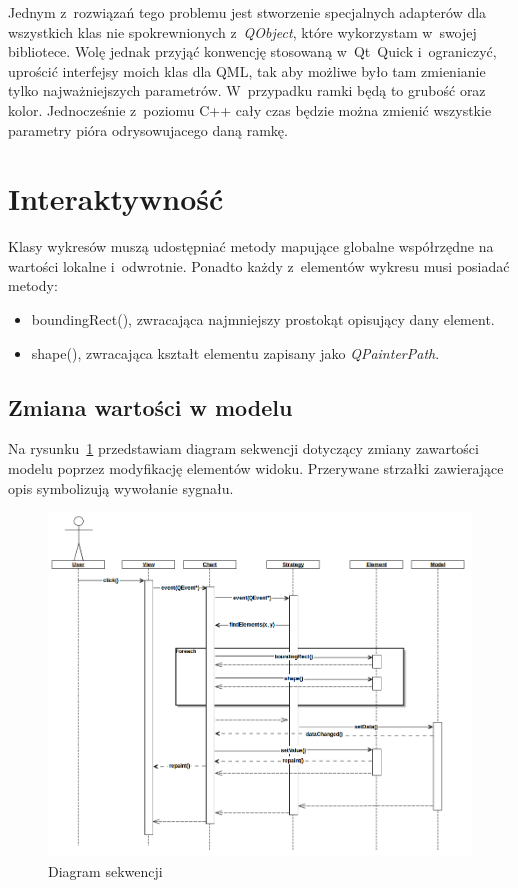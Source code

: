 Jednym z~rozwiązań tego problemu jest stworzenie specjalnych adapterów dla wszystkich klas nie spokrewnionych z~\textit{QObject}, które wykorzystam w~swojej bibliotece. Wolę jednak przyjąć konwencję stosowaną w~Qt~Quick i~ograniczyć, uprościć interfejsy moich klas dla QML, tak aby możliwe było tam zmienianie tylko najważniejszych parametrów. W~przypadku ramki będą to grubość oraz kolor. Jednocześnie z~poziomu C++ cały czas będzie można zmienić wszystkie parametry pióra odrysowujacego daną ramkę.

\section{Interaktywność}
Klasy wykresów muszą udostępniać metody mapujące globalne współrzędne na wartości lokalne i~odwrotnie. Ponadto każdy z~elementów wykresu musi posiadać metody:
\begin{itemize}
\item{boundingRect(), zwracająca najmniejszy prostokąt opisujący dany element.}
\item{shape(), zwracająca kształt elementu zapisany jako \textit{QPainterPath}.}
\end{itemize}

\subsection{Zmiana wartości w modelu}
Na rysunku~\ref{rys:seq:inter} przedstawiam diagram sekwencji dotyczący zmiany zawartości modelu poprzez modyfikację elementów widoku. Przerywane strzałki zawierające opis symbolizują wywołanie sygnału.

\begin{figure}
\centering
\caption{Diagram sekwencji}\label{rys:seq:inter}
\includegraphics[scale=0.6]{img/seq_inter.png}
\end{figure}

